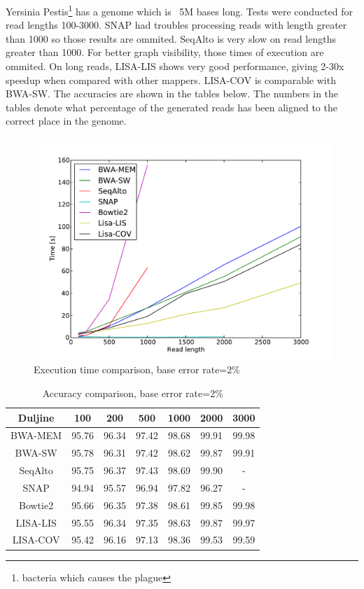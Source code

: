 \documentclass[times, utf8, diplomski]{fer}
\begin{document}
Yersinia Pestis\footnote{bacteria which causes the plague} has a genome which is ~5M bases long. Tests were conducted for read lengths 100-3000. SNAP had troubles processing reads with length greater than 1000 so those results are ommited. SeqAlto is very slow on read lengths greater than 1000. For better graph visibility, those times of execution are ommited. On long reads, LISA-LIS shows very good performance, giving 2-30x speedup when compared with other mappers. LISA-COV is comparable with BWA-SW. The accuracies are shown in the tables below. The numbers in the tables denote what percentage of the generated reads has been aligned to the correct place in the genome. 

\begin{figure}[H]
\centering
\includegraphics[width=1.0\textwidth]{../img/yersinia-e02-time.pdf}
\caption{Execution time comparison, base error rate=2\%}\label{yersinia-e02-time}
\end{figure}

\begin{table}[H]
\centering
\begin{tabular}{|c||c|c|c|c|c|c|}
\hline
	Duljine & 100 & 200 & 500 & 1000 & 2000 & 3000\\
\hline
\hline
	BWA-MEM & 95.76 & 96.34 & 97.42 & 98.68 & 99.91 & 99.98\\
\hline
	BWA-SW  & 95.78 & 96.31 & 97.42 & 98.62 & 99.87 & 99.91\\
\hline
	SeqAlto & 95.75 & 96.37 & 97.43 & 98.69 & 99.90 & -\\
\hline
	SNAP    & 94.94 & 95.57 & 96.94 & 97.82 & 96.27 & -\\
\hline
	Bowtie2 & 95.66 & 96.35 & 97.38 & 98.61 & 99.85 & 99.98\\
\hline
	LISA-LIS   & 95.55 & 96.34 & 97.35 & 98.63 & 99.87 & 99.97\\
\hline
	LISA-COV    & 95.42 & 96.16 & 97.13 & 98.36 & 99.53 & 99.59\\
\hline
\end{tabular}
\caption{Accuracy comparison, base error rate=2\%}\label{yersinia-e02-correct}
\end{table}
\end{document}
